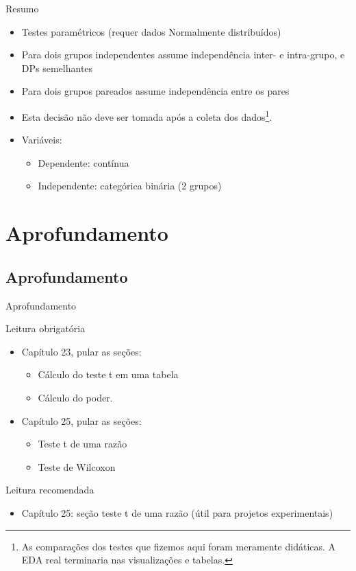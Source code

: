 \documentclass{beamer}
\begin{document}
\begin{frame}{\scriptsize Resumo}
  \begin{itemize}
    \footnotesize
  \item Testes paramétricos ({\footnotesize requer dados Normalmente distribuídos})
  \item Para dois grupos independentes assume independência inter- e intra-grupo, e DPs semelhantes
  \item Para dois grupos pareados assume independência entre os pares
  \item Esta decisão \alert{não deve} ser tomada após a coleta dos dados\footnote{\scriptsize As comparações dos testes que fizemos aqui foram meramente didáticas. A EDA real terminaria nas visualizações e tabelas.}.
  \item Variáveis:
    \begin{itemize}
      \scriptsize
    \item Dependente: contínua
    \item Independente: categórica binária (2 grupos)
    \end{itemize}
  \end{itemize}
\end{frame}

\section{Aprofundamento}

\subsection{Aprofundamento}

\begin{frame}{\scriptsize Aprofundamento}
  \begin{block}{Leitura obrigatória}
    \begin{itemize}
      \footnotesize
    \item Capítulo 23, pular as seções:
      \begin{itemize}
        \scriptsize
      \item Cálculo do teste t em uma tabela
      \item Cálculo do poder.
      \end{itemize}
    \item Capítulo 25, pular as seções:
      \begin{itemize}
        \scriptsize
      \item Teste t de uma razão
      \item Teste de Wilcoxon
      \end{itemize}
    \end{itemize}
  \end{block}
  \begin{block}{Leitura recomendada}
    \begin{itemize}
      \scriptsize
    \item Capítulo 25: seção teste t de uma razão ({\tiny útil para projetos experimentais})
      \end{itemize}
  \end{block}
\end{frame}
\end{document}
